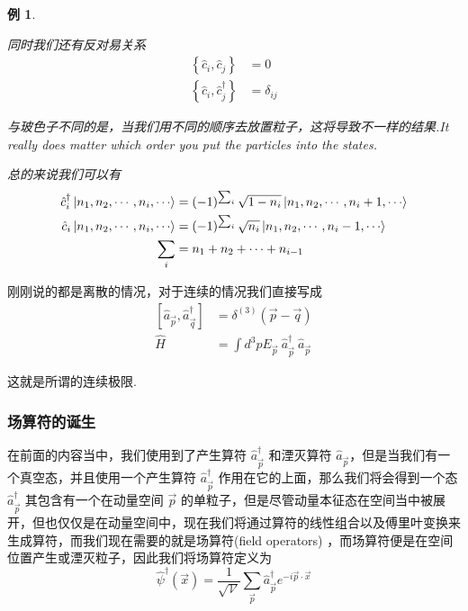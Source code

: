 \documentclass{article}
\newtheorem{example}{例}
\begin{document}
\begin{example}
\begin{enumerate}
        同时我们还有反对易关系
        \begin{align*}
            \left\{\hat{c}_i,\hat{c}_j\right\} &= 0 \\
            \left\{\hat{c}_i,\hat{c}_j^\dagger\right\} &= \delta_{ij}
        \end{align*}

        与玻色子不同的是，当我们用不同的顺序去放置粒子，这将导致不一样的结果.It really does matter which order you put the particles into the states.

        总的来说我们可以有
        \begin{align*}
            \hat{c}_i^\dagger \ket{n_1,n_2,\cdots,n_i,\cdots} &= \left(-1\right)^{\sum_i} \sqrt{1 - n_i} \ket{n_1,n_2,\cdots,n_i +1 ,\cdots} \\
            \hat{c}_i \ket{n_1,n_2,\cdots,n_i,\cdots} &= \left(-1\right)^{\sum_i} \sqrt{n_i} \ket{n_1,n_2,\cdots,n_i -1 ,\cdots} \\
            \sum_i &= n_1 + n_2 + \cdots + n_{i - 1}
        \end{align*}
        
    \end{enumerate}
\end{example}

刚刚说的都是离散的情况，对于连续的情况我们直接写成
\begin{align*}
    \left[\hat{a}_{\vec{p}},\hat{a}_{\vec{q}}^\dagger\right] &= \delta^{(3)}\left(\vec{p} - \vec{q}\right) \\
    \hat{H} &= \int d^3p E_{\vec{p}} \  \hat{a}_{\vec{p}}^\dagger \  \hat{a}_{\vec{p}}
\end{align*}

这就是所谓的连续极限.



\subsubsection{场算符的诞生}

在前面的内容当中，我们使用到了产生算符 $\hat{a}_{\vec{p}}^\dagger$ 和湮灭算符 $\hat{a}_{\vec{p}}$，但是当我们有一个真空态，并且使用一个产生算符 $\hat{a}_{\vec{p}}^\dagger$ 作用在它的上面，那么我们将会得到一个态 $\hat{a}_{\vec{p}}^\dagger$ 其包含有一个在动量空间 $\vec{p}$ 的单粒子，但是尽管动量本征态在空间当中被展开，但也仅仅是在动量空间中，现在我们将通过算符的线性组合以及傅里叶变换来生成算符，而我们现在需要的就是场算符(field operators) ，而场算符便是在空间位置产生或湮灭粒子，因此我们将场算符定义为
\begin{equation*}
    \hat{\psi}^\dagger (\vec{x}) = \frac{1}{\sqrt{\mathcal{V}}}\sum_{\vec{p}} \hat{a}_{\vec{p}}^\dagger e^{-i\vec{p}\cdot \vec{x}}
\end{equation*}
\end{document}
